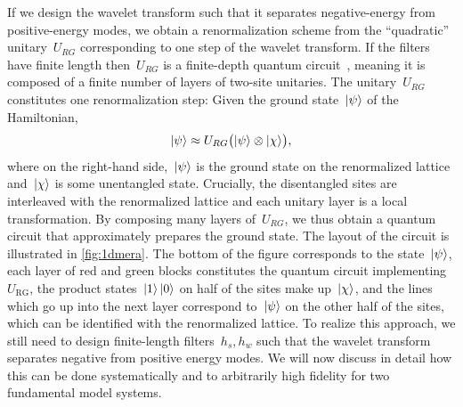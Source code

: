 \documentclass[aps,pra,reprint,superscriptaddress,floatfix,amsmath,amssymb,amsfonts]{revtex4-1}
\newcommand*{\ot}{\otimes}
\begin{document}
If we design the wavelet transform such that it separates negative-energy from positive-energy modes, we obtain a renormalization scheme from the ``quadratic'' unitary~$U_{RG}$ corresponding to one step of the wavelet transform.
If the filters have finite length then~$U_{RG}$ is a finite-depth quantum circuit~\cite{evenbly2016representation}, meaning it is composed of a finite number of layers of two-site unitaries.
The unitary~$U_{RG}$ constitutes one renormalization step:
Given the ground state~$\ket\psi$ of the Hamiltonian,
\begin{equation*}
\ket\psi \approx  U_{RG} \bigl( \ket\psi \ot \ket\chi \bigr),
\end{equation*}
where on the right-hand side,~$\ket\psi$ is the ground state on the renormalized lattice and~$\ket\chi$ is some unentangled state.
Crucially, the disentangled sites are interleaved with the renormalized lattice and each unitary layer is a local transformation.
By composing many layers of~$U_{RG}$, we thus obtain a quantum circuit that approximately prepares the ground state.
The layout of the circuit is illustrated in \cref{fig:1dmera}.
The bottom of the figure corresponds to the state~$\ket\psi$, each layer of red and green blocks constitutes the quantum circuit implementing~$U_{\text{RG}}$, the product states~$\ket 1\ket 0$ on half of the sites make up~$\ket\chi$, and the lines which go up into the next layer correspond to~$\ket\psi$ on the other half of the sites, which can be identified with the renormalized lattice.
To realize this approach, we still need to design finite-length filters~$h_s,h_w$ such that the wavelet transform separates negative from positive energy modes.
We will now discuss in detail how this can be done systematically and to arbitrarily high fidelity for two fundamental model systems.

\end{document}
